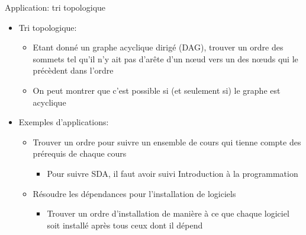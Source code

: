 



\begin{frame}{Application: tri topologique}
\begin{itemize}
\item Tri topologique:
\begin{itemize}
\item Etant donné un \alert{graphe acyclique dirigé} (DAG), trouver un
  ordre des sommets tel qu'il n'y ait pas d'arête d'un n\oe ud vers un
  des n\oe uds qui le précèdent dans l'ordre
\item On peut montrer que c'est possible si (et seulement si) le
  graphe est acyclique
\end{itemize}

\bigskip

\item Exemples d'applications:
\begin{itemize}
\item Trouver un ordre pour suivre un ensemble de cours qui tienne compte des prérequis de chaque cours
\begin{itemize}
\item Pour suivre SDA, il faut avoir suivi Introduction à la programmation
\end{itemize}
\item Résoudre les dépendances pour l'installation de logiciels
\begin{itemize}
\item Trouver un ordre d'installation de manière à ce que chaque logiciel soit installé après tous ceux dont il dépend
\end{itemize}
\end{itemize}
\end{itemize}

\end{frame}

